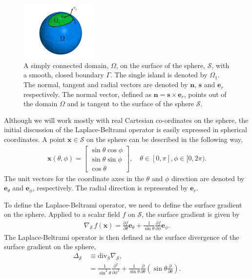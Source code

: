 \documentclass{sfuthesis}
\begin{document}
\begin{figure} [h] 
	\centering
	\includegraphics[width=0.35\textwidth]{SimplyConnectedDomain}
    	\caption{A simply connected domain, $\Omega$, on the surface of the sphere, $\mathcal{S}$, with a smooth, closed boundary $\Gamma$. The single island is denoted by ${\Omega}_1$. The normal, tangent and radial vectors are denoted by $\mathbf{n}$, $\mathbf{s}$ and ${\mathbf{e}}_r$ respectively. The normal vector, defined as $\mathbf{n}=\mathbf{s}\times{\mathbf{e}}_r$, points out of the domain $\Omega$ and is tangent to the surface of the sphere $\mathcal{S}$.}
   	\label{fig: SimplyConnectedDomain}
\end{figure}

Although we will work mostly with real Cartesian co-ordinates on the sphere, the initial discussion of the Laplace-Beltrami operator is easily expressed in spherical coordinates. A point $\mathbf{x} \in \mathcal{S}$ on the sphere can be described in the following way, 
\begin{align*}
	\mathbf{x}(\theta, \phi)=\begin{bmatrix} \sin\theta\cos\phi \\
                                                              \sin\theta\sin\phi \\
                                                              \cos\theta
                                                              \end{bmatrix}, \quad \theta \in [0,\pi], \phi \in [0, 2\pi).
\end{align*}
\noindent The unit vectors for the coordinate axes in the $\theta$ and $\phi$ direction are denoted by ${\mathbf{e}}_{\theta}$ and ${\mathbf{e}}_{\phi}$, respectively. The radial direction is represented by $\mathbf{e}_r$.  

To define the Laplace-Beltrami operator, we need to define the surface gradient on the sphere. Applied to a scalar field $f$ on $\mathcal{S}$, the surface gradient is given by 
\begin{align*}
	{\nabla}_\mathcal{S \ } f(\mathbf{x})= \frac{\partial f}{\partial \theta} {\mathbf{e}}_\theta + \frac{1}{\sin\theta}\frac{\partial f}{\partial \phi} {\mathbf{e}}_\phi . 
\end{align*}
The Laplace-Beltrami operator is then defined as the surface divergence of the surface gradient on the sphere, 
\begin{align*}
	\Delta_{\mathcal{S} \ } & \equiv \text{div}_S \nabla_{\mathcal{S}}, \\
                                    		& = \frac{1}{{\sin}^2\theta} \frac{{\partial}^2}{\partial \phi^2} + \frac{1}{\sin{\theta}} \frac{\partial}{\partial \theta} \left(\sin \theta \frac{\partial}{\partial \theta}\right).
\end{align*}
\end{document}
